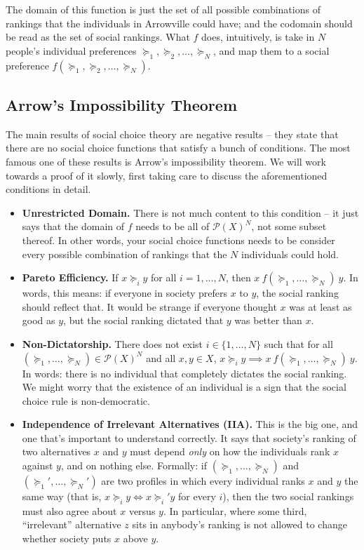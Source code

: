 \documentclass[12pt]{article}
\theoremstyle{definition}
\theoremstyle{remark}
\theoremstyle{plain}                          %
\begin{document}
The domain of this function is just the set of all possible combinations of rankings that the individuals in Arrowville could have; and the codomain should be read as the set of social rankings. What $f$ does, intuitively, is take in $N$ people's individual preferences $\succeq_1,\succeq_2,\dots,\succeq_N$, and map them to a social preference $f(\succeq_1,\succeq_2,\dots,\succeq_N)$.
 
\subsection{Arrow's Impossibility Theorem}
 
The main results of social choice theory are negative results -- they state that there are no social choice functions that satisfy a bunch of conditions. The most famous one of these results is Arrow's impossibility theorem. We will work towards a proof of it slowly, first taking care to discuss the aforementioned conditions in detail.
 
\begin{itemize}[nosep]
    \item \textbf{Unrestricted Domain.} There is not much content to this condition -- it just says that the domain of $f$ needs to be all of $\mathscr P(X)^N$, not some subset thereof. In other words, your social choice functions needs to be consider every possible combination of rankings that the $N$ individuals could hold.
    \item \textbf{Pareto Efficiency.} If $x \succeq_i y$ for all $i=1,\dots,N$, then $x \ f(\succeq_1,\dots,\succeq_N) \ y$. In words, this means: if everyone in society prefers $x$ to $y$, the social ranking should reflect that. It would be strange if everyone thought $x$ was at least as good as $y$, but the social ranking dictated that $y$ was better than $x$.
    \item \textbf{Non-Dictatorship.} There does not exist $i \in \{1,\dots,N\}$ such that for all $(\succeq_1,\dots,\succeq_N) \in \mathscr P(X)^N$ and all $x,y \in X$, $x \succeq_i y \implies x \ f(\succeq_1,\dots,\succeq_N) \ y$. In words: there is no individual that completely dictates the social ranking. We might worry that the existence of an individual is a sign that the social choice rule is non-democratic.
    \item \textbf{Independence of Irrelevant Alternatives (IIA).} This is the big one, and one that's important to understand correctly. It says that society's ranking of two alternatives $x$ and $y$ must depend \emph{only} on how the individuals rank $x$ against $y$, and on nothing else. Formally: if $(\succeq_1,\dots,\succeq_N)$ and $(\succeq_1',\dots,\succeq_N')$ are two profiles in which every individual ranks $x$ and $y$ the same way (that is, $x \succeq_i y \iff x \succeq_i' y$ for every $i$), then the two social rankings must also agree about $x$ versus $y$. In particular, where some third, ``irrelevant'' alternative $z$ sits in anybody's ranking is not allowed to change whether society puts $x$ above $y$.\\
\end{itemize}
\end{document}
